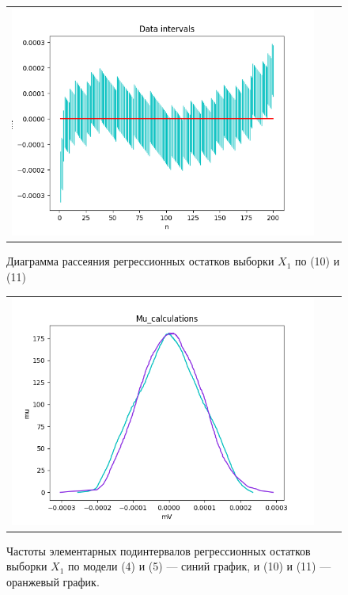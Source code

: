 \documentclass[a4paper,14pt]{article}
\begin{document}
	\begin{figure}[H]
		\begin{center}
			\begin{tabular}{ccc}
				\includegraphics[scale=0.8]{../image/regression_2.png}
			\end{tabular}
		\end{center}
		\caption{Диаграмма рассеяния регрессионных остатков выборки $X_1$ по (10) и (11)} 
	\end{figure}
	\begin{figure}[H]
		\begin{center}
			\begin{tabular}{ccc}
				\includegraphics[scale=0.8]{../image/input_mu.png}
			\end{tabular}
		\end{center}
		\caption{Частоты элементарных подинтервалов регрессионных остатков выборки $X_1$ по модели (4) и (5) — синий график, и (10) и (11) — оранжевый график.} 
	\end{figure}
		
\end{document}
